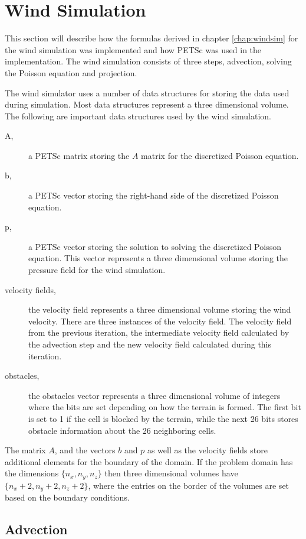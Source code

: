 \section{Wind Simulation}

This section will describe how the formulas derived in chapter \ref{chap:windsim}
for the wind simulation was implemented and how PETSc was used in the
implementation. The wind simulation consists of three steps, advection, solving
the Poisson equation and projection. 

The wind simulator uses a number of data structures for storing the data used
during simulation. Most data structures represent a three dimensional volume.
The following are important data structures used by the wind simulation.
\begin{description}
	\item[A,] a PETSc matrix storing the $A$ matrix for the discretized Poisson
		equation.
	\item[b,] a PETSc vector storing the right-hand side of the discretized
		Poisson equation.
	\item[p,] a PETSc vector storing the solution to solving the discretized
		Poisson equation. This vector represents a three dimensional volume
		storing the pressure field for the wind simulation.
	\item[velocity fields,] the velocity field represents a three dimensional
		volume storing the wind velocity. There are three instances of the velocity
		field. The velocity field from the previous iteration, the intermediate
		velocity field calculated by the advection step and the new velocity
		field calculated during this iteration.
	\item[obstacles,] the obstacles vector represents a three dimensional volume
		of integers where the bits are set depending on how the terrain is
		formed. The first bit is set to 1 if the cell is blocked by the terrain,
		while the next 26 bits stores obstacle information about the 26
		neighboring cells.
\end{description}
The matrix $A$, and the vectors $b$ and $p$ as well as the velocity fields store
additional elements for the boundary of the domain. If the problem domain has
the dimensions $\{ n_x, n_y, n_z \}$ then three dimensional volumes have
$\{ n_x+2, n_y+2, n_z+2 \}$, where the entries on the border of the volumes are
set based on the boundary conditions.

\subsection{Advection}

